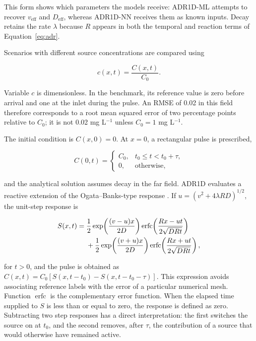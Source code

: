 \documentclass[11pt,a4paper]{article}
\begin{document}
This form shows which parameters the models receive: ADR1D-ML attempts to
recover $v_{\mathrm{eff}}$ and $D_{\mathrm{eff}}$, whereas ADR1D-NN receives
them as known inputs. Decay retains the rate $\lambda$ because $R$ appears in
both the temporal and reaction terms of Equation~\eqref{eq:adr}.

Scenarios with different source concentrations are compared using

\begin{equation}
c(x,t)=\frac{C(x,t)}{C_0}.
\label{eq:normalized-concentration}
\end{equation}

Variable $c$ is dimensionless. In the benchmark, its reference value is zero
before arrival and one at the inlet during the pulse. An RMSE of 0.02 in this
field therefore corresponds to a root mean squared error of two percentage
points relative to $C_0$; it is not 0.02 mg L$^{-1}$ unless $C_0=1$
mg L$^{-1}$.

The initial condition is $C(x,0)=0$. At $x=0$, a rectangular pulse is prescribed,

\begin{equation}
C(0,t)=
\begin{cases}
C_0, & t_0\leq t<t_0+\tau,\\
0, & \text{otherwise},
\end{cases}
\end{equation}

and the analytical solution assumes decay in the far field. ADR1D evaluates a
reactive extension of the Ogata--Banks-type response
\cite{ogata1961,chen2011}. If $u=(v^2+4\lambda R D)^{1/2}$, the unit-step
response is

\begin{align}
S(x,t)={}&\frac{1}{2}\exp\!\left(\frac{(v-u)x}{2D}\right)
\operatorname{erfc}\!\left(\frac{Rx-ut}{2\sqrt{DRt}}\right)\notag\\
&+\frac{1}{2}\exp\!\left(\frac{(v+u)x}{2D}\right)
\operatorname{erfc}\!\left(\frac{Rx+ut}{2\sqrt{DRt}}\right),
\end{align}

for $t>0$, and the pulse is obtained as
$C(x,t)=C_0[S(x,t-t_0)-S(x,t-t_0-\tau)]$. This expression avoids associating
reference labels with the error of a particular numerical mesh. Function
$\operatorname{erfc}$ is the complementary error function. When the elapsed
time supplied to $S$ is less than or equal to zero, the response is defined as
zero. Subtracting two step responses has a direct interpretation: the first
switches the source on at $t_0$, and the second removes, after $\tau$, the
contribution of a source that would otherwise have remained active.
\end{document}
